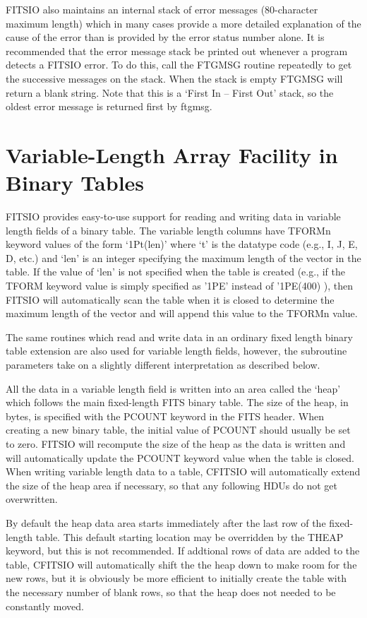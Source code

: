 \documentclass[11pt]{book}
\begin{document}
FITSIO also maintains an internal stack of error messages (80-character
maximum length) which in many cases provide a more detailed explanation
of the cause of the error than is provided by the error status number
alone. It is recommended that the error message stack be printed out
whenever a program detects a FITSIO error. To do this, call the FTGMSG
routine repeatedly to get the successive messages on the stack. When the
stack is empty FTGMSG will return a blank string. Note that this is a
`First In -- First Out' stack, so the oldest error message is returned
first by ftgmsg.


\section{Variable-Length Array Facility in Binary Tables}

FITSIO provides easy-to-use support for reading and writing data in
variable length fields of a binary table. The variable length columns
have TFORMn keyword values of the form `1Pt(len)' where `t' is the
datatype code (e.g., I, J, E, D, etc.) and `len' is an integer
specifying the maximum length of the vector in the table.  If the value
of `len' is not specified when the table is created (e.g., if the TFORM
keyword value is simply specified as '1PE' instead of '1PE(400) ), then
FITSIO will automatically scan the table when it is closed to
determine the maximum length of the vector and will append this value
to the TFORMn value.

The same routines which read and write data in an ordinary fixed length
binary table extension are also used for variable length fields,
however, the subroutine parameters take on a slightly different
interpretation as described below.

All the data in a variable length field is written into an area called
the `heap' which follows the main fixed-length FITS binary table.  The
size of the heap, in bytes, is specified with the PCOUNT keyword in the
FITS header.  When creating a new binary table, the initial value of
PCOUNT should usually be set to zero.  FITSIO will recompute the size
of the heap as the data is written and will automatically update the
PCOUNT keyword value when the table is closed.  When writing variable
length data to a table, CFITSIO will automatically extend the size
of the heap area if necessary, so that any following HDUs do not
get overwritten.

By default the heap data area starts immediately after the last row of
the fixed-length table.  This default starting location may be
overridden by the THEAP keyword, but this is not recommended.
If addtional rows of data are added to the table, CFITSIO will
automatically shift the the heap down to make room for the new
rows, but it is obviously be more efficient to initially
create the table with the necessary number of blank rows, so that
the heap does not needed to be constantly moved.
\end{document}
